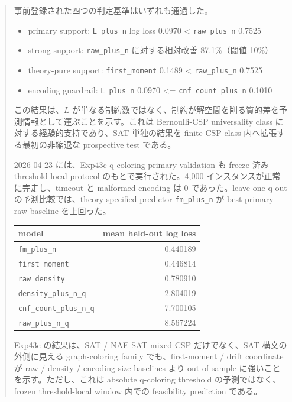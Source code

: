 \documentclass[12pt,a4paper]{article}
\begin{document}
\begin{abstract}
事前登録された四つの判定基準はいずれも通過した。

\begin{itemize}
\tightlist
\item
  primary support: \texttt{L\_plus\_n} log loss 0.0970 \textless{} \texttt{raw\_plus\_n} 0.7525
\item
  strong support: \texttt{raw\_plus\_n} に対する相対改善 87.1\%（閾値 10\%）
\item
  theory-pure support: \texttt{first\_moment} 0.1489 \textless{} \texttt{raw\_plus\_n} 0.7525
\item
  encoding guardrail: \texttt{L\_plus\_n} 0.0970 \textless= \texttt{cnf\_count\_plus\_n} 0.1010
\end{itemize}

この結果は、\(L\) が単なる制約数ではなく、制約が解空間を削る質的差を予測情報として運ぶことを示す。これは Bernoulli-CSP universality class に対する経験的支持であり、SAT 単独の結果を finite CSP class 内へ拡張する最初の非縮退な prospective test である。

2026-04-23 には、Exp43c q-coloring primary validation も freeze 済み threshold-local protocol のもとで実行された。4,000 インスタンスが正常に完走し、timeout と malformed encoding は 0 であった。leave-one-q-out の予測比較では、theory-specified predictor \texttt{fm\_plus\_n} が best primary raw baseline を上回った。

{\def\LTcaptype{table} %
\begin{longtable}[]{@{}lr@{}}
\toprule\noalign{}
model & mean held-out log loss \\
\midrule\noalign{}
\endhead
\bottomrule\noalign{}
\endlastfoot
\texttt{fm\_plus\_n} & 0.440189 \\
\texttt{first\_moment} & 0.446814 \\
\texttt{raw\_density} & 0.780910 \\
\texttt{density\_plus\_n\_q} & 2.804019 \\
\texttt{cnf\_count\_plus\_n\_q} & 7.700105 \\
\texttt{raw\_plus\_n\_q} & 8.567224 \\
\end{longtable}
}

Exp43c の結果は、SAT / NAE-SAT mixed CSP だけでなく、SAT 構文の外側に見える graph-coloring family でも、first-moment / drift coordinate が raw / density / encoding-size baselines より out-of-sample に強いことを示す。ただし、これは absolute q-coloring threshold の予測ではなく、frozen threshold-local window 内での feasibility prediction である。


\end{abstract}
\end{document}

